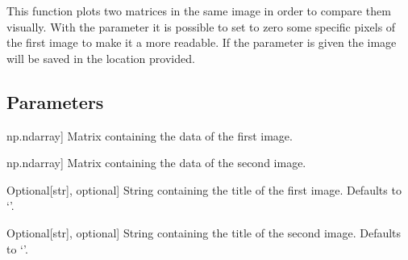 \documentclass[letterpaper,10pt,english]{sphinxmanual}
\begin{document}
\begin{fulllineitems}
\label{\detokenize{index:hicanalysis.visualizegraph.plot_matrix_comparison}}
\pysigstartsignatures
{}
\pysigstopsignatures
\sphinxAtStartPar
This function plots two matrices in the same image in order to compare them visually.
With the parameter  it is possible to set to zero some specific pixels
of the first image to make it a more readable.
If the parameter  is given the image will be saved in the location provided.


\subsection{Parameters}
\label{\detokenize{index:id21}}\begin{description}
\sphinxlineitem{matrix1}{[}np.ndarray{]}
\sphinxAtStartPar
Matrix containing the data of the first image.

\sphinxlineitem{matrix2}{[}np.ndarray{]}
\sphinxAtStartPar
Matrix containing the data of the second image.

\sphinxlineitem{title1}{[}Optional{[}str{]}, optional{]}
\sphinxAtStartPar
String containing the title of the first image. Defaults to ‘’.

\sphinxlineitem{title2}{[}Optional{[}str{]}, optional{]}
\sphinxAtStartPar
String containing the title of the second image. Defaults to ‘’.


\end{description}
\end{fulllineitems}
\end{document}
